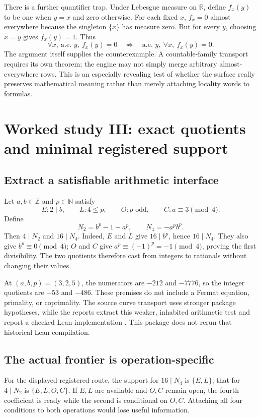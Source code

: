 \documentclass[11pt,a4paper]{article}
\theoremstyle{definition}
\theoremstyle{remark}
\newcommand{\NN}{\mathbb N}
\newcommand{\ZZ}{\mathbb Z}
\newcommand{\RR}{\mathbb R}
\begin{document}
There is a further quantifier trap. Under Lebesgue measure on $\RR$, define
$f_x(y)$ to be one when $y=x$ and zero otherwise. For each fixed $x$, $f_x=0$
almost everywhere because the singleton $\{x\}$ has measure zero. But for every
$y$, choosing $x=y$ gives $f_x(y)=1$. Thus
\[
 \forall x,\ \text{a.e. }y,\ f_x(y)=0
 \quad\not\Longrightarrow\quad
 \text{a.e. }y,\ \forall x,\ f_x(y)=0.
\]
The argument itself supplies the counterexample. A countable-family transport
requires its own theorem; the engine may not simply merge arbitrary
almost-everywhere rows. This is an especially revealing test of whether the
surface really preserves mathematical meaning rather than merely attaching
locality words to formulas.

\section{Worked study III: exact quotients and minimal registered support}
\label{sec:frey}

\subsection{Extract a satisfiable arithmetic interface}
Let $a,b\in\ZZ$ and $p\in\NN$ satisfy
\begin{equation}\label{eq:F0}
 E:2\mid b,\qquad L:4\le p,\qquad O:p\text{ odd},\qquad C:a\equiv3\pmod4.
\end{equation}
Define
\[
 N_2=b^p-1-a^p,\qquad N_4=-a^pb^p.
\]
Then $4\mid N_2$ and $16\mid N_4$. Indeed, $E$ and $L$ give $16\mid b^p$,
hence $16\mid N_4$. They also give $b^p\equiv0\pmod4$; $O$ and $C$ give
$a^p\equiv(-1)^p=-1\pmod4$, proving the first divisibility. The two quotients
therefore cast from integers to rationals without changing their values.

At $(a,b,p)=(3,2,5)$, the numerators are $-212$ and $-7776$, so the integer
quotients are $-53$ and $-486$. These premises do not include a Fermat equation,
primality, or coprimality. The source curve transport uses stronger package
hypotheses, while the reports extract this weaker, inhabited arithmetic test
and report a checked Lean implementation \cite{frey,synA,synB}. This package
does not rerun that historical Lean compilation.

\subsection{The actual frontier is operation-specific}
For the displayed registered route, the support for $16\mid N_4$ is
$\{E,L\}$; that for $4\mid N_2$ is $\{E,L,O,C\}$. If $E,L$ are available and
$O,C$ remain open, the fourth coefficient is ready while the second is
conditional on $O,C$. Attaching all four conditions to both operations would
lose useful information.
\end{document}
